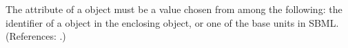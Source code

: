 The  attribute of a \Parameter object must be a value chosen
from among the following: the identifier of a \UnitDefinition object in the
enclosing \Model object, or one of the base units in SBML.  (References:
.)
